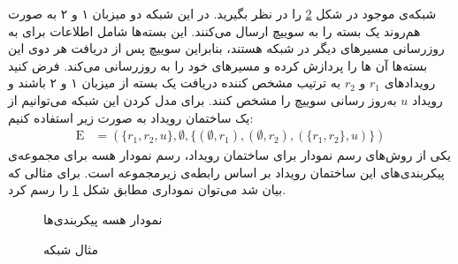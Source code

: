 \documentclass[
msc,
irfonts
]{./tex/tehran-thesis}
\newcommand{\پ}{پروژه/پایان‌نامه/رساله }
\theoremstyle{definition}
\theoremstyle{theorem}
\theoremstyle{definition}
\numberwithin{algorithm}{chapter}
\newcommand{\s}[1]{\{#1\}}
\newcommand{\e}{\emptyset}
\newcommand{\crd}[4][above]{
    \node[draw,circle,inner sep=2pt,fill,label={[#1]:#4}] at (#2,#3) {};
}
\newcommand{\lf}[1]{\LTRfootnote{#1}}
\begin{document}
شبکه‌ی موجود در شکل
\ref{fig:es:update}
را در نظر بگیرید.
در این شبکه دو میزبان ۱ و ۲ به صورت هم‌روند یک بسته را به سوییچ ارسال می‌کنند.
این بسته‌ها شامل اطلاعات برای به روزرسانی مسیر‌های دیگر در شبکه هستند، بنابراین سوییچ پس از دریافت هر دوی این بسته‌ها آن ها را پردازش کرده و مسیر‌های خود را به روزرسانی می‌کند.
فرض کنید رویدادهای 
$r_1$
و
$r_2$
به ترتیب مشخص کننده‌ دریافت یک بسته از میزبان ۱ و ۲ باشند و 
رویداد 
$u$
به‌روز رسانی سوییچ را مشخص کنند.
برای مدل کردن این شبکه می‌توانیم از یک ساختمان رویداد به صورت زیر استفاده کنیم:
\begin{align*}
    \mathrm{E} & = (
    \s{r_1,r_2,u},
    \e, \s{(\e,r_1),(\e,r_2),(\s{r_1,r_2},u)}
    )
\end{align*}
یکی از روش‌های رسم نمودار برای ساختمان رویداد، رسم نمودار هسه\lf{Hasse}
برای مجموعه‌ی پیکربندی‌های این ساختمان رویداد بر اساس رابطه‌ی زیرمجموعه است.
برای مثالی که بیان شد می‌توان نموداری مطابق شکل
\ref{fig:es:configs}
را رسم کرد.
\begin{figure}
    \centering
    \caption{نمودار هسه پیکربندی‌ها}
    \label{fig:es:configs}
\end{figure}

\begin{figure}
    \centering
    \caption{مثال شبکه}
    \label{fig:es:update}
\end{figure} 
\end{document}
